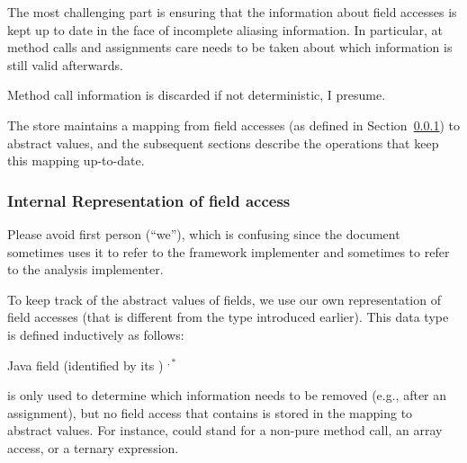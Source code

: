 The most challenging part is ensuring that the information about
field accesses is kept up to date in the face of incomplete aliasing
information.  In particular, at method calls and assignments care needs to be
taken about which information is still valid afterwards.

\begin{workinprogress}
Method call information is discarded if not deterministic, I presume.
\end{workinprogress}

The store maintains a mapping from field accesses (as defined in Section~\ref{sec:field-access}) to
abstract values, and the subsequent sections describe the operations that
keep this mapping up-to-date.


\subsubsection{Internal Representation of field access}
\label{sec:field-access}

\begin{workinprogress}
Please avoid first person (``we''), which is confusing since the document
sometimes uses it to refer to the framework implementer and sometimes to
refer to the analysis implementer.
\end{workinprogress}


To keep track of the abstract values of fields, we use our own representation
of field accesses
(that is different from the  type introduced earlier).  This
data type is defined inductively as follows:

\begin{bnfgrammar}
        {  \qquad Java field (identified by its )}
        { \qquad {}}
        {  
            \literal{(} $^{,*}$ \literal{)}}
\end{bnfgrammar}

 is only used to determine which
information needs to be removed (e.g., after an assignment), but no field
access that contains  is stored in the mapping to
abstract values.  For instance,  could stand for
a non-pure method call, an array access, or a ternary expression.


